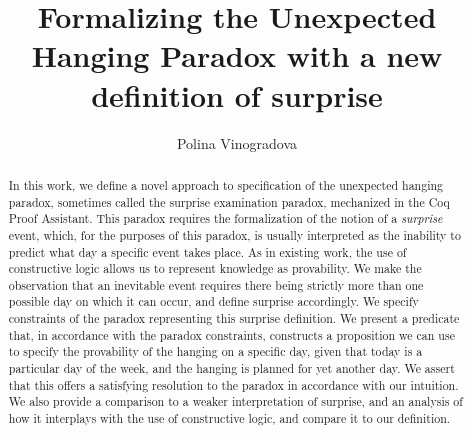 \documentclass[runningheads]{llncs}
\begin{document}
%
\title{Formalizing the Unexpected Hanging Paradox with a new definition of surprise} %
%
%
\author{Polina Vinogradova }
%
%
%
\maketitle              %
%
\begin{abstract}

  In this work, we define a novel approach to specification of the
  unexpected hanging paradox, sometimes called the surprise examination paradox,
  mechanized in the Coq Proof Assistant.
  This paradox requires the formalization of the notion of
  a \emph{surprise} event, which, for the purposes of this paradox, is usually interpreted as
  the inability to predict what day a specific event takes place. As in existing work,
  the use of constructive logic allows us to represent knowledge as provability.
  We make the observation that an inevitable event requires there being strictly
  more than one possible day on which it can occur, and define surprise accordingly. We
  specify constraints of the paradox representing this surprise definition.
  We present a predicate that, in accordance with the paradox constraints, constructs a
  proposition we can use to specify
  the provability of the hanging on a specific day, given that today is a particular day of the week, and the hanging
  is planned for yet another day.
  We assert that this offers a satisfying resolution to the paradox in accordance with
  our intuition.
  We also provide a comparison to a weaker interpretation of surprise,
  and an analysis of how it interplays with the use of constructive logic, and
  compare it to our definition.

\end{abstract}
%
\end{document}
